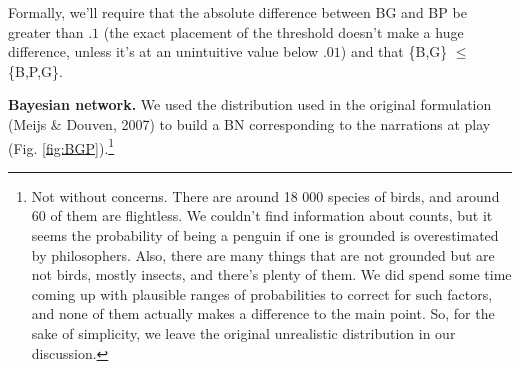 \documentclass[
  10pt,
]{scrartcl}
\newcommand{\s}[1]{\textsf{#1}}
\begin{document}
\noindent Formally, we'll require that the absolute difference between \s{BG} and \s{BP} be greater than \(.1\) (the exact placement of the threshold doesn't make a huge difference, unless it's at an unintuitive value below \(.01\)) and that \{\s{B},\s{G}\} \(\leq\) \{\s{B},\s{P},\s{G}\}.

\noindent \textbf{Bayesian network.} We used the distribution used in the original formulation (Meijs \& Douven, 2007) to build a BN corresponding to the narrations at play (Fig. \ref{fig:BGP}).\footnote{Not without concerns. There are around 18 000 species of birds, and around 60 of them are flightless. We  couldn't find information about counts, but it seems the probability of being a penguin if one is grounded is overestimated by philosophers.  Also, there are many things that are not grounded but are not birds, mostly insects, and there's plenty of them. We did spend some time coming up with plausible ranges of probabilities to correct for such factors, and none of them actually makes a difference to the main point. So, for the sake of simplicity, we leave the original unrealistic distribution in our discussion.}
\end{document}
